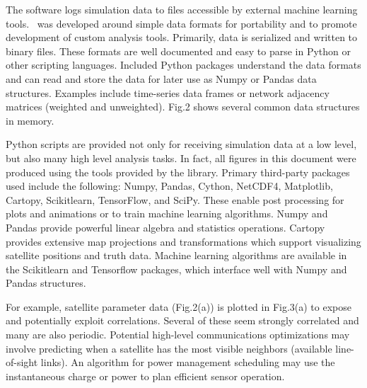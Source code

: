 \documentclass[conference]{IEEEtran}
\newcommand{\project}{{\sc{Collaborate}}~}
\begin{document}
The software logs simulation data to files accessible by external machine
learning tools.  \project was developed around simple data formats for
portability and to promote development of custom analysis tools.  Primarily,
data is serialized and written to binary files.  These formats are well
documented and easy to parse in Python or other scripting languages.  Included
Python packages understand the data formats and can read and store the data for
later use as Numpy or Pandas data structures.  Examples include time-series data
frames or network adjacency matrices (weighted and unweighted).  Fig.2
shows several common data structures in memory.

Python scripts are provided not only for receiving simulation data at a low
level, but also many high level analysis tasks.  In fact, all figures in this
document were produced using the tools provided by the library.  Primary
third-party packages used include the following: Numpy, Pandas, Cython, NetCDF4,
Matplotlib, Cartopy, Scikitlearn, TensorFlow, and SciPy.  These enable post
processing for plots and animations or to train machine learning algorithms.
Numpy and Pandas provide powerful linear algebra and statistics operations.
Cartopy provides extensive map projections and transformations which support
visualizing satellite positions and truth data.  Machine learning algorithms are
available in the Scikitlearn and Tensorflow packages, which interface well with
Numpy and Pandas structures.

For example, satellite parameter data (Fig.2(a)) is plotted in Fig.3(a) to
expose and potentially exploit correlations.  Several of these seem strongly
correlated and many are also periodic.  Potential high-level communications
optimizations may involve predicting when a satellite has the most visible
neighbors (available line-of-sight links).  An algorithm for power management
scheduling may use the instantaneous charge or power to plan efficient sensor
operation.
\end{document}
